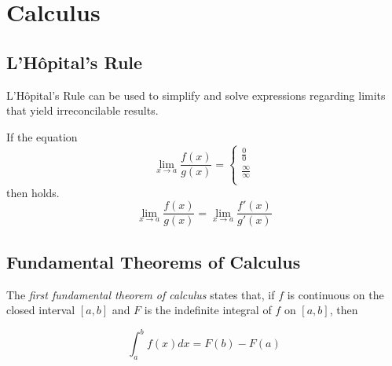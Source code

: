 \section{Calculus}\label{app:Calculus}
\subsection{L'H\^{o}pital's Rule}\label{subsec:LHopitals_Rule}
L'H\^{o}pital's Rule can be used to simplify and solve expressions regarding limits that yield irreconcilable results.
\begin{lemma}\label{lemma:LHopitals_Rule}
  If the equation
  \begin{equation*}
    \lim\limits_{x \rightarrow a} \frac{f(x)}{g(x)} =
    \begin{cases}
      \frac{0}{0} \\
      \frac{\infty}{\infty} \\
    \end{cases}
  \end{equation*}
  then  holds.
  \begin{equation}\label{eq:LHopitals_Rule}
    \lim\limits_{x \rightarrow a} \frac{f(x)}{g(x)} = \lim\limits_{x \rightarrow a} \frac{f'(x)}{g'(x)}
  \end{equation}
\end{lemma}

\subsection{Fundamental Theorems of Calculus}\label{subsec:Fundamental Theorem of Calculus}
\begin{definition}\label{def:1st Fundamental Theorem of Calculus}
  The \emph{first fundamental theorem of calculus} states that, if $f$ is continuous on the closed interval $\left[ a,b \right]$ and $F$ is the indefinite integral of $f$ on $\left[ a,b \right]$, then

  \begin{equation}\label{eq:1st Fundamental Theorem of Calculus}
    \int_{a}^{b}f \left( x \right) dx = F \left( b \right) - F \left( a \right)
  \end{equation}
\end{definition}

